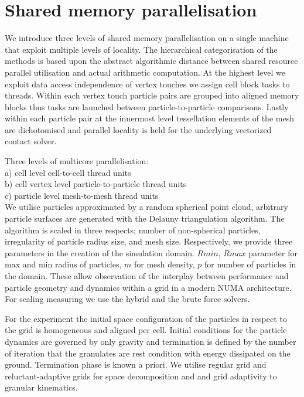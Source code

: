 \section{Shared memory parallelisation}
\label{section:shared-memory}

We introduce three levels of shared memory parallelisation on a single machine that exploit multiple levels of locality. The hierarchical categorisation of the methods is based upon the abstract algorithmic distance between shared resource parallel utilisation and actual arithmetic computation. At the highest level we exploit  data access independence of vertex touches we assign cell block tasks to threads. Within each vertex touch particle pairs are grouped into aligned memory blocks thus tasks are launched between particle-to-particle comparisons. Lastly within each particle pair at the innermost level tessellation elements of the mesh are dichotomised and parallel locality is held for the underlying vectorized contact solver.

Three levels of multicore parallelisation:\\

a) cell level cell-to-cell thread units\\

b) cell vertex level particle-to-particle thread units\\

c) particle level mesh-to-mesh thread units\\

We utilise particles approximated by a random spherical point cloud, arbitrary particle surfaces are generated with the Delauny triangulation algorithm. The algorithm is scaled in three respects; number of non-spherical particles, irregularity of particle radius size, and mesh size. Respectively, we provide three parameters in the creation of the simulation domain. $Rmin$, $Rmax$ parameter for max and min radius of particles, $m$ for mesh density, $p$ for number of particles in the domain. These allow observation of the interplay between performance and particle geometry and dynamics within a grid in a modern NUMA architecture. For scaling measuring we use the hybrid and the brute force solvers.

For the experiment the initial space configuration of the particles in respect to the grid is homogeneous and aligned per cell. Initial conditions for the particle dynamics are governed by only gravity and termination is defined by the number of iteration that the granulates are rest condition with energy dissipated on the ground. Termination phase is known a priori. We utilise regular grid and reluctant-adaptive grids for space decomposition and and grid adaptivity to granular kinematics. 

